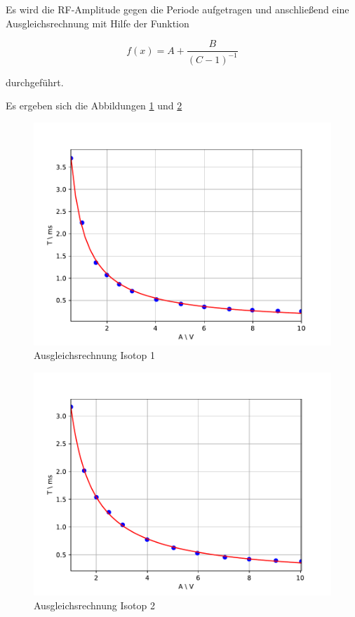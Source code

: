 Es wird die RF-Amplitude gegen die Periode aufgetragen und anschließend eine Ausgleichsrechnung mit Hilfe der Funktion

\begin{equation}
f(x) = A + \frac{B}{(C-1)^{-1}}
\end{equation}

durchgeführt.

Es ergeben sich die Abbildungen \ref{trans1} und \ref{trans2}

\begin{figure}[H]
\centering
\includegraphics[scale=0.8]{./optischesPumpen/img/trans1.pdf}
\caption{Ausgleichsrechnung Isotop 1}
\label{trans1}
\end{figure}

\begin{figure}[H]
\centering
\includegraphics[scale=0.8]{./optischesPumpen/img/trans2.pdf}
\caption{Ausgleichsrechnung Isotop 2}
\label{trans2}
\end{figure}


